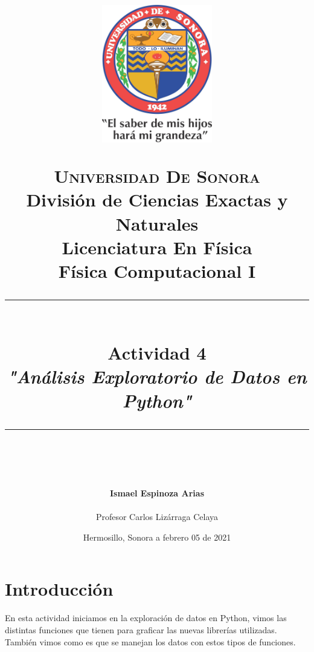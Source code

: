 \documentclass[12pt]{article}
\newcommand{\HRule}[1]{\rule{\linewidth}{#1}}
\begin{document}
\begin{titlepage}

\title{ \normalsize 
        \begin{center}
        \includegraphics[height=6cm]{Logo.jpg}
        \end{center}
        \LARGE \textsc{\textbf{Universidad De Sonora}} \\ \bigskip
		\Large División de Ciencias Exactas y Naturales \\
        Licenciatura En Física \\ \bigskip
        \bigskip
        Física Computacional I
		\\ [0.1cm]  
		\HRule{2pt} \\
		\Large \textbf{{Actividad 4}} \\
        \textit{\textbf{"Análisis Exploratorio de Datos en Python"}}
		\HRule{2pt} \\
		\normalsize \vspace*{0.001\baselineskip}}
        
\date{\bigskip \Large  \hspace*{\fill} Hermosillo, Sonora a febrero 05 de 2021}

        
\author{
		\Large\textbf{ Ismael Espinoza Arias} \\ \bigskip
        \\ \bigskip
       \Large Profesor Carlos Lizárraga Celaya}
       \end{titlepage}
       \maketitle
       

\newpage
\pagestyle{plain}
\section{Introducción}
 En esta actividad iniciamos en la exploración de datos en Python, vimos las distintas funciones que tienen para graficar las nuevas librerías utilizadas. También vimos como es que se manejan los datos con estos tipos de funciones.
\end{document}
